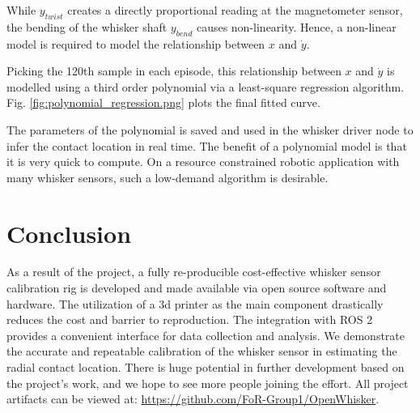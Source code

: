 \documentclass[runningheads]{llncs}
\begin{document}
While \(y_{twist}\) creates a directly proportional reading at the magnetometer sensor, the bending of the whisker shaft \(y_{bend}\) causes non-linearity. Hence, a non-linear model is required to model the relationship between \(x\) and \(\dot{y}\).

Picking the 120th sample in each episode, this relationship between \(x\) and \(\dot{y}\) is modelled using a third order polynomial via a least-square regression algorithm. Fig. \ref*{fig:polynomial_regression.png} plots the final fitted curve.

The parameters of the polynomial is saved and used in the whisker driver node to infer the contact location in real time. The benefit of a polynomial model is that it is very quick to compute. On a resource constrained robotic application with many whisker sensors, such a low-demand algorithm is desirable.

\section{Conclusion}

As a result of the project, a fully re-producible cost-effective whisker sensor calibration rig is developed and made available via open source software and hardware. The utilization of a 3d printer as the main component drastically reduces the cost and barrier to reproduction. The integration with ROS 2 provides a convenient interface for data collection and analysis. We demonstrate the accurate and repeatable calibration of the whisker sensor in estimating the radial contact location. There is huge potential in further development based on the project's work, and we hope to see more people joining the effort. All project artifacts can be viewed at: \url{https://github.com/FoR-Group1/OpenWhisker}.


\end{document}
